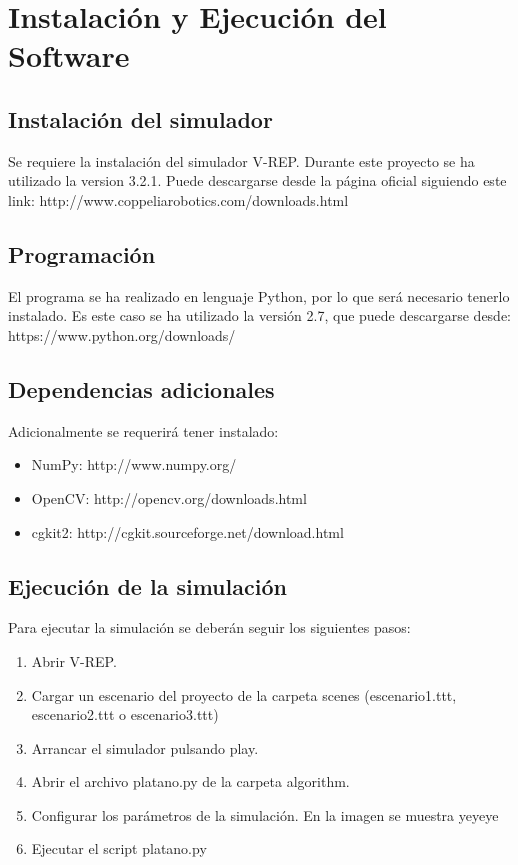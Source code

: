 \chapter{Instalación y Ejecución del Software}
\label{app:installing}

\section{Instalación del simulador}

Se requiere la instalación del simulador V-REP. Durante este proyecto se ha utilizado la version 3.2.1. Puede descargarse desde la página oficial siguiendo este link: http://www.coppeliarobotics.com/downloads.html

\section{Programación}

El programa se ha realizado en lenguaje Python, por lo que será necesario tenerlo instalado. Es este caso se ha utilizado la versión 2.7, que puede descargarse desde: https://www.python.org/downloads/

\section{Dependencias adicionales}

Adicionalmente se requerirá tener instalado:
\begin{itemize}
	\item NumPy: http://www.numpy.org/
	\item OpenCV: http://opencv.org/downloads.html 
	\item cgkit2: http://cgkit.sourceforge.net/download.html
\end{itemize}

\section{Ejecución de la simulación}

Para ejecutar la simulación se deberán seguir los siguientes pasos:
\begin{enumerate}
	\item Abrir V-REP.
	\item Cargar un escenario del proyecto de la carpeta scenes (escenario1.ttt, escenario2.ttt o escenario3.ttt)
	\item Arrancar el simulador pulsando play.
	\item Abrir el archivo platano.py de la carpeta algorithm.
	\item Configurar los parámetros de la simulación. En la imagen se muestra 
	\subitem yeyeye
	\item Ejecutar el script platano.py
\end{enumerate}